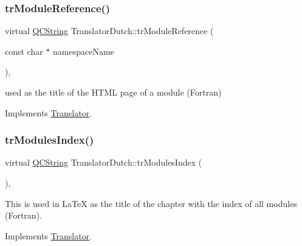 \mbox{\label{class_translator_dutch_aa5d2344603e4edcc45d0af70934cb1c6}} 
\subsubsection{\texorpdfstring{trModuleReference()}{trModuleReference()}}
{\footnotesize\ttfamily virtual \mbox{\hyperlink{class_q_c_string}{Q\+C\+String}} Translator\+Dutch\+::tr\+Module\+Reference (\begin{DoxyParamCaption}\item[{const char $\ast$}]{namespace\+Name }\end{DoxyParamCaption})\hspace{0.3cm}{\ttfamily [inline]}, {\ttfamily [virtual]}}

used as the title of the H\+T\+ML page of a module (Fortran) 

Implements \mbox{\hyperlink{class_translator}{Translator}}.

\mbox{\label{class_translator_dutch_a073a86f41761e64a30bc9dee76d35d8b}} 
\subsubsection{\texorpdfstring{trModulesIndex()}{trModulesIndex()}}
{\footnotesize\ttfamily virtual \mbox{\hyperlink{class_q_c_string}{Q\+C\+String}} Translator\+Dutch\+::tr\+Modules\+Index (\begin{DoxyParamCaption}{ }\end{DoxyParamCaption})\hspace{0.3cm}{\ttfamily [inline]}, {\ttfamily [virtual]}}

This is used in La\+TeX as the title of the chapter with the index of all modules (Fortran). 

Implements \mbox{\hyperlink{class_translator}{Translator}}.

\mbox{\label{class_translator_dutch_a30552149aeec73208d6a205f8e77d223}} 
